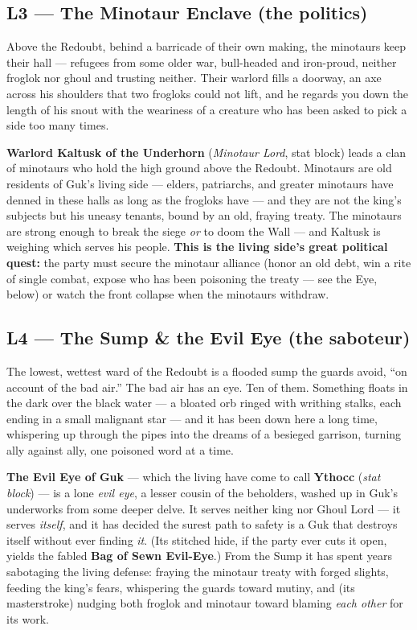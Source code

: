 \documentclass[10pt,twoside]{report}
\begin{document}
\subsection*{L3 --- The Minotaur Enclave (the politics)}
\begin{readaloud}
Above the Redoubt, behind a barricade of their own making, the minotaurs keep their hall --- refugees from some older war, bull-headed and iron-proud, neither froglok nor ghoul and trusting neither. Their warlord fills a doorway, an axe across his shoulders that two frogloks could not lift, and he regards you down the length of his snout with the weariness of a creature who has been asked to pick a side too many times.
\end{readaloud}
\textbf{Warlord Kaltusk of the Underhorn} (\emph{Minotaur Lord}, stat block) leads a clan of minotaurs who hold the high ground above the Redoubt. Minotaurs are old residents of Guk's living side --- elders, patriarchs, and greater minotaurs have denned in these halls as long as the frogloks have --- and they are not the king's subjects but his uneasy tenants, bound by an old, fraying treaty. The minotaurs are strong enough to break the siege \emph{or} to doom the Wall --- and Kaltusk is weighing which serves his people. \textbf{This is the living side's great political quest:} the party must secure the minotaur alliance (honor an old debt, win a rite of single combat, expose who has been poisoning the treaty --- see the Eye, below) or watch the front collapse when the minotaurs withdraw.

\subsection*{L4 --- The Sump \& the Evil Eye (the saboteur)}
\begin{readaloud}
The lowest, wettest ward of the Redoubt is a flooded sump the guards avoid, ``on account of the bad air.'' The bad air has an eye. Ten of them. Something floats in the dark over the black water --- a bloated orb ringed with writhing stalks, each ending in a small malignant star --- and it has been down here a long time, whispering up through the pipes into the dreams of a besieged garrison, turning ally against ally, one poisoned word at a time.
\end{readaloud}
\textbf{The Evil Eye of Guk} --- which the living have come to call \textbf{Ythocc} (\emph{stat block}) --- is a lone \emph{evil eye}, a lesser cousin of the beholders, washed up in Guk's underworks from some deeper delve. It serves neither king nor Ghoul Lord --- it serves \emph{itself}, and it has decided the surest path to safety is a Guk that destroys itself without ever finding \emph{it}. (Its stitched hide, if the party ever cuts it open, yields the fabled \textbf{Bag of Sewn Evil-Eye}.) From the Sump it has spent years sabotaging the living defense: fraying the minotaur treaty with forged slights, feeding the king's fears, whispering the guards toward mutiny, and (its masterstroke) nudging both froglok and minotaur toward blaming \emph{each other} for its work.
\end{document}
